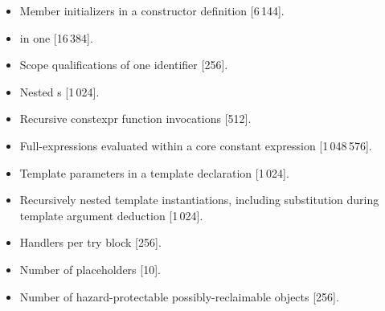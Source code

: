 \begin{itemize}
\item%
Member initializers in a constructor definition [6\,144].
\item%
 in one  [16\,384].
\item%
Scope qualifications of one identifier [256].
\item%
Nested s [1\,024].
\item%
Recursive constexpr function invocations [512].
\item%
Full-expressions evaluated within a core constant expression [1\,048\,576].
\item%
Template parameters in a template declaration [1\,024].
\item%
Recursively nested template instantiations, including substitution
during template argument deduction [1\,024].
\item%
Handlers per try block [256].
\item%
Number of placeholders [10].
\item%
Number of hazard-protectable possibly-reclaimable objects [256].

\end{itemize}
